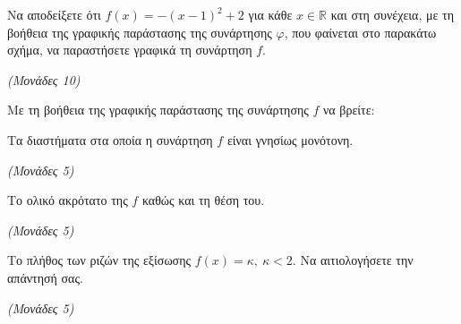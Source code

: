 \documentclass[11pt,a4paper,twoside]{book}
\newcommand{\monades}[1]{\hfill \textit{(Μονάδες #1)}}
\begin{document}
\begin{alist}
\item Να αποδείξετε ότι $f(x) = - (x - 1)^{2} + 2$ για κάθε $x\mathbb{\in R}$ και στη συνέχεια, με τη βοήθεια της γραφικής παράστασης της συνάρτησης $\varphi$, που φαίνεται στο παρακάτω σχήμα, να παραστήσετε γραφικά τη συνάρτηση $f.$


\begin{center}


\end{center}


\monades{10}

\item Με τη βοήθεια της γραφικής παράστασης της συνάρτησης $f$ να βρείτε:

\end{alist}
\begin{alist}
\item
  Τα διαστήματα στα οποία η συνάρτηση $f$ είναι γνησίως μονότονη.

\monades{5}


\end{alist}
\begin{alist}
\item
  Το ολικό ακρότατο της $f$ καθώς και τη θέση του.

\monades{5}


\end{alist}
\begin{alist}
\item
  Το πλήθος των ριζών της εξίσωσης $f(x) = \kappa,\ \kappa < 2.$ Να αιτιολογήσετε την απάντησή σας.

\monades{5}
\end{alist}
\end{document}
